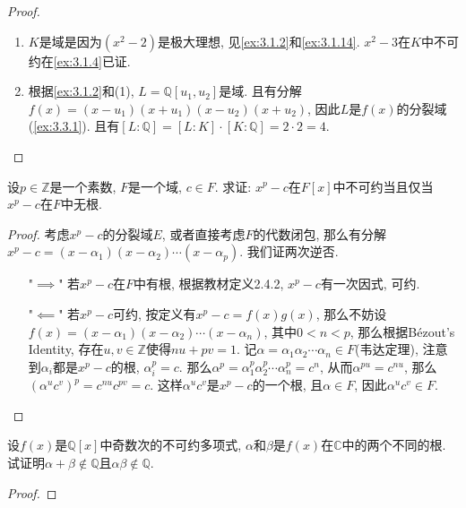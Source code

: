 \begin{proof}
    \begin{enumerate}[(1)]
        \item $K$是域是因为$(x^2 - 2)$是极大理想, 见\ref{ex:3.1.2}和\ref{ex:3.1.14}. $x^2 - 3$在$K$中不可约在\ref{ex:3.1.4}已证.
        \item 根据\ref{ex:3.1.2}和(1), $L = \mathbb{Q}[u_1, u_2]$是域. 且有分解$f(x) = (x - u_1)(x + u_1)(x - u_2)(x + u_2)$, 因此$L$是$f(x)$的分裂域(\ref{ex:3.3.1}). 且有$[L:\mathbb{Q}] = [L:K] \cdot [K:\mathbb{Q}] = 2 \cdot 2 = 4$.
    \end{enumerate}
\end{proof}

\begin{problem}
    设$p \in \mathbb{Z}$是一个素数, $F$是一个域, $c \in F$. 求证: $x^p - c$在$F[x]$中不可约当且仅当$x^p - c$在$F$中无根.
\end{problem}

\begin{proof}
    考虑$x^p - c$的分裂域$E$, 或者直接考虑$F$的代数闭包, 那么有分解$x^p - c = (x - \alpha_1)(x - \alpha_2) \cdots (x - \alpha_p)$. 我们证两次逆否.
    \begin{enumerate}
        \item["$\implies$"] 若$x^p - c$在$F$中有根, 根据教材定义2.4.2, $x^p - c$有一次因式, 可约.
        \item["$\impliedby$"] 若$x^p - c$可约, 按定义有$x^p - c = f(x)g(x)$, 那么不妨设$f(x) = (x - \alpha_1)(x - \alpha_2) \cdots (x - \alpha_n)$, 其中$0 < n < p$, 那么根据Bézout's Identity, 存在$u, v \in \mathbb{Z}$使得$nu + pv = 1$. 记$\alpha = \alpha_1\alpha_2 \cdots \alpha_n \in F$(韦达定理), 注意到$\alpha_i$都是$x^p - c$的根, $\alpha_i^p = c$. 那么$\alpha^p = \alpha_1^p\alpha_2^p \cdots \alpha_n^p = c^n$, 从而$\alpha^{pu} = c^{nu}$, 那么$(\alpha^uc^v)^p = c^{nu}c^{pv} = c$. 这样$\alpha^uc^v$是$x^p - c$的一个根, 且$\alpha \in F$, 因此$\alpha^uc^v \in F$.
    \end{enumerate}
\end{proof}

\begin{problem}
    设$f(x)$是$\mathbb{Q}[x]$中奇数次的不可约多项式, $\alpha$和$\beta$是$f(x)$在$\mathbb{C}$中的两个不同的根. 试证明$\alpha + \beta \notin \mathbb{Q}$且$\alpha\beta \notin \mathbb{Q}$.
\end{problem}

\begin{proof}
    
\end{proof}

